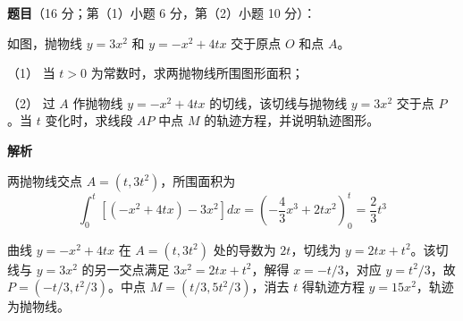 \begin{answer}

\textbf{题目}（16 分；第（1）小题 6 分，第（2）小题 10 分）：

如图，抛物线 \(y=3x^2\) 和 \(y=-x^2+4tx\) 交于原点 \(O\) 和点 \(A\)。

（1） 当 \(t>0\) 为常数时，求两抛物线所围图形面积；

（2） 过 \(A\) 作抛物线 \(y=-x^2+4tx\) 的切线，该切线与抛物线 \(y=3x^2\) 交于点 \(P\)。当 \(t\) 变化时，求线段 \(AP\) 中点 \(M\) 的轨迹方程，并说明轨迹图形。
\nopagebreak[4]
\begin{center}\end{center}
\nopagebreak[4]
\textbf{解析}


两抛物线交点 \(A=(t,3t^2)\)，所围面积为
\nopagebreak[4]
\[
\int_0^t[(-x^2+4tx)-3x^2]dx=\left(-\frac43x^3+2tx^2\right)_0^t=\frac23t^3
\]


曲线 \(y=-x^2+4tx\) 在 \(A=(t,3t^2)\) 处的导数为 \(2t\)，切线为 \(y=2tx+t^2\)。该切线与 \(y=3x^2\) 的另一交点满足 \(3x^2=2tx+t^2\)，解得 \(x=-t/3\)，对应 \(y=t^2/3\)，故 \(P=(-t/3,t^2/3)\)。中点 \(M=(t/3,5t^2/3)\)，消去 \(t\) 得轨迹方程 \(y=15x^2\)，轨迹为抛物线。



\end{answer}

